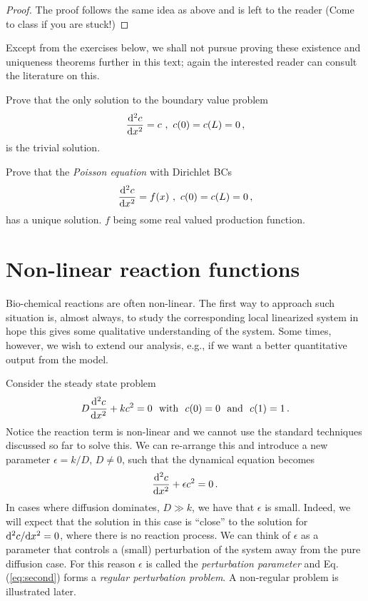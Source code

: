 \begin{proof}
	The proof follows the same idea as above and is left to the reader 
	(Come to class if you are stuck!)
\end{proof}

Except from the exercises below, we shall not pursue proving these 
existence and uniqueness theorems further in this text; again the 
interested reader can consult the literature on this. 

\begin{exerciseregion}
\begin{exercise}
  Prove that the only solution to the boundary value problem
  \begin{equation}
    \frac{\mathrm{d}^2c}{\mathrm{d} x^2} = c \ , \ c(0)=c(L)=0 \, ,
  \end{equation}
  is the trivial solution.
\end{exercise}

\begin{exercise}
	Prove that the \emph{Poisson equation} with Dirichlet BCs
	\begin{equation}
	  \frac{\mathrm{d}^2c}{\mathrm{d} x^2} = f(x) \ , \ c(0)=c(L)=0 \, ,
	\end{equation}
	has a unique solution. $f$ being some real valued production function.
\end{exercise}

\end{exerciseregion}
 

\section{Non-linear reaction functions}
Bio-chemical reactions are often non-linear. The 
first way to approach such situation is, almost always, to study the
corresponding local linearized system in hope this gives some qualitative
understanding of the system. Some times, however, we wish to extend our analysis, e.g., 
if we want a better quantitative output from the model. 

Consider the steady state problem
\begin{equation}
  D\frac{\d^2c}{\d x^2} + k c^2 = 0 \ \ \text{with} \ \ 
  c(0) = 0 \ \ \text{and} \ \ c(1)=1 \, .
\end{equation}
Notice the reaction term is non-linear and we cannot use the standard
techniques discussed so far to solve this. We can re-arrange this and introduce a 
new parameter $\epsilon = k/D$, $D \neq 0$, 
such that the dynamical equation becomes
\begin{equation}
  \label{eq:second}
  \frac{\mathrm{d}^2c}{\mathrm{d} x^2} + \epsilon c^2 = 0 \, . 
\end{equation}
In cases where diffusion dominates, $D \gg k$, we have that $\epsilon$ is small. 
Indeed, we will expect that the solution in this case 
is ``close'' to the solution for $\mathrm{d}^2c/\mathrm{d} x^2 = 0$,  
where there is no reaction process. We can think of $\epsilon$ as a parameter that controls 
a (small) perturbation of the system away from the pure diffusion case. 
For this reason $\epsilon$ is called the \emph{perturbation parameter} and Eq. (\ref{eq:second}) 
forms a \emph{regular perturbation problem}. A non-regular problem is illustrated later.

